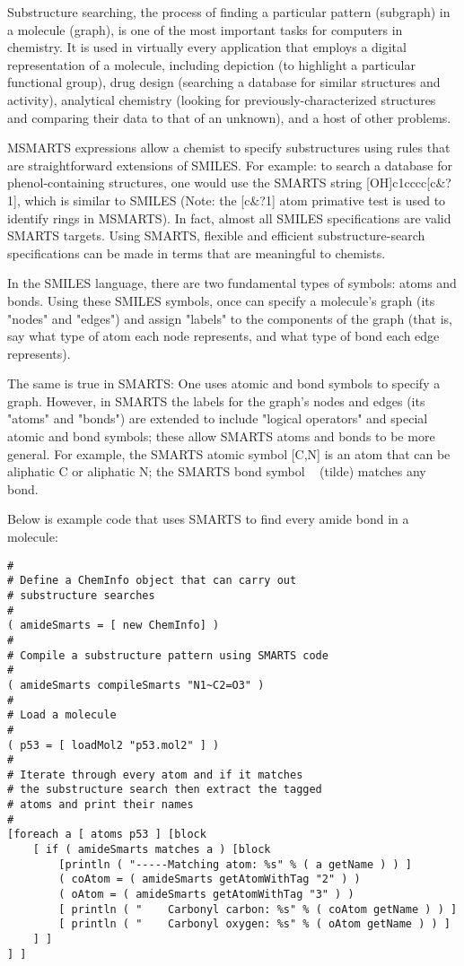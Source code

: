 \begin{itemize}
   Substructure searching, the process of finding a particular pattern (subgraph) in a molecule (graph), is one of the most important tasks for computers in chemistry. It is used in virtually every application that employs a digital representation of a molecule, including depiction (to highlight a particular functional group), drug design (searching a database for similar structures and activity), analytical chemistry (looking for previously-characterized structures and comparing their data to that of an unknown), and a host of other problems.

   MSMARTS expressions allow a chemist to specify substructures using rules that 
   are straightforward extensions of SMILES. For example: to search a database 
   for phenol-containing structures, one would use the SMARTS string 
   [OH]c1cccc[c\&?1], which is similar to SMILES (Note: the [c\&?1] atom 
   primative test is used to identify rings in MSMARTS). In fact, almost all 
   SMILES specifications are valid SMARTS targets. Using SMARTS, flexible 
   and efficient substructure-search specifications can be made in terms 
   that are meaningful to chemists.

   In the SMILES language, there are two fundamental types of symbols: atoms and bonds. Using these SMILES symbols, once can specify a molecule's graph (its "nodes" and "edges") and assign "labels" to the components of the graph (that is, say what type of atom each node represents, and what type of bond each edge represents).

   The same is true in SMARTS: One uses atomic and bond symbols to specify a graph. However, in SMARTS the labels for the graph's nodes and edges (its "atoms" and "bonds") are extended to include "logical operators" and special atomic and bond symbols; these allow SMARTS atoms and bonds to be more general. For example, the SMARTS atomic symbol [C,N] is an atom that can be aliphatic C or aliphatic N; the SMARTS bond symbol ~ (tilde) matches any bond.

Below is example code that uses SMARTS to find every amide bond in a molecule:
\begin{verbatim}
#
# Define a ChemInfo object that can carry out
# substructure searches
#
( amideSmarts = [ new ChemInfo] )
#
# Compile a substructure pattern using SMARTS code
#
( amideSmarts compileSmarts "N1~C2=O3" )
# 
# Load a molecule
#
( p53 = [ loadMol2 "p53.mol2" ] )
#
# Iterate through every atom and if it matches
# the substructure search then extract the tagged
# atoms and print their names
#
[foreach a [ atoms p53 ] [block
    [ if ( amideSmarts matches a ) [block 
        [println ( "-----Matching atom: %s" % ( a getName ) ) ]
        ( coAtom = ( amideSmarts getAtomWithTag "2" ) )
        ( oAtom = ( amideSmarts getAtomWithTag "3" ) )
        [ println ( "    Carbonyl carbon: %s" % ( coAtom getName ) ) ]
        [ println ( "    Carbonyl oxygen: %s" % ( oAtom getName ) ) ]
    ] ]
] ]
\end{verbatim}


\end{itemize}
